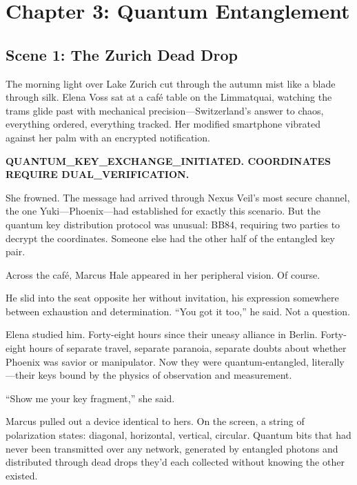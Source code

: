 \hypertarget{chapter-3-quantum-entanglement}{%
\section{Chapter 3: Quantum Entanglement}\label{chapter-3-quantum-entanglement}}

\hypertarget{scene-1-the-zurich-dead-drop}{%
\subsection{Scene 1: The Zurich Dead Drop}\label{scene-1-the-zurich-dead-drop}}

The morning light over Lake Zurich cut through the autumn mist like a blade through silk. Elena Voss sat at a café table on the Limmatquai, watching the trams glide past with mechanical precision---Switzerland's answer to chaos, everything ordered, everything tracked. Her modified smartphone vibrated against her palm with an encrypted notification.

\textbf{QUANTUM\_KEY\_EXCHANGE\_INITIATED. COORDINATES REQUIRE DUAL\_VERIFICATION.}

She frowned. The message had arrived through Nexus Veil's most secure channel, the one Yuki---Phoenix---had established for exactly this scenario. But the quantum key distribution protocol was unusual: BB84, requiring two parties to decrypt the coordinates. Someone else had the other half of the entangled key pair.

Across the café, Marcus Hale appeared in her peripheral vision. Of course.

He slid into the seat opposite her without invitation, his expression somewhere between exhaustion and determination. ``You got it too,'' he said. Not a question.

Elena studied him. Forty-eight hours since their uneasy alliance in Berlin. Forty-eight hours of separate travel, separate paranoia, separate doubts about whether Phoenix was savior or manipulator. Now they were quantum-entangled, literally---their keys bound by the physics of observation and measurement.

``Show me your key fragment,'' she said.

Marcus pulled out a device identical to hers. On the screen, a string of polarization states: diagonal, horizontal, vertical, circular. Quantum bits that had never been transmitted over any network, generated by entangled photons and distributed through dead drops they'd each collected without knowing the other existed.

